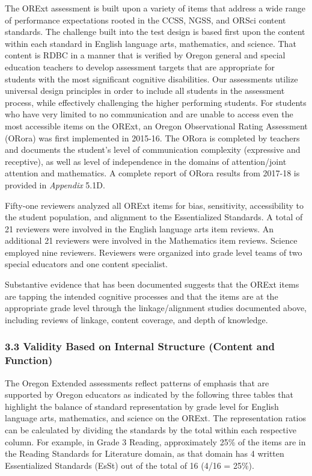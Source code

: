 \documentclass[]{article}
\begin{document}
The ORExt assessment is built upon a variety of items that address a
wide range of performance expectations rooted in the CCSS, NGSS, and
ORSci content standards. The challenge built into the test design is
based first upon the content within each standard in English language
arts, mathematics, and science. That content is RDBC in a manner that is
verified by Oregon general and special education teachers to develop
assessment targets that are appropriate for students with the most
significant cognitive disabilities. Our assessments utilize universal
design principles in order to include all students in the assessment
process, while effectively challenging the higher performing students.
For students who have very limited to no communication and are unable to
access even the most accessible items on the ORExt, an Oregon
Observational Rating Assessment (ORora) was first implemented in
2015-16. The ORora is completed by teachers and documents the student's
level of communication complexity (expressive and receptive), as well as
level of independence in the domains of attention/joint attention and
mathematics. A complete report of ORora results from 2017-18 is provided
in \emph{Appendix} 5.1D.

Fifty-one reviewers analyzed all ORExt items for bias, sensitivity,
accessibility to the student population, and alignment to the
Essentialized Standards. A total of 21 reviewers were involved in the
English language arts item reviews. An additional 21 reviewers were
involved in the Mathematics item reviews. Science employed nine
reviewers. Reviewers were organized into grade level teams of two
special educators and one content specialist.

Substantive evidence that has been documented suggests that the ORExt
items are tapping the intended cognitive processes and that the items
are at the appropriate grade level through the linkage/alignment studies
documented above, including reviews of linkage, content coverage, and
depth of knowledge.

\subsubsection{3.3 Validity Based on Internal Structure (Content and
Function)}\label{validity-based-on-internal-structure-content-and-function}

The Oregon Extended assessments reflect patterns of emphasis that are
supported by Oregon educators as indicated by the following three tables
that highlight the balance of standard representation by grade level for
English language arts, mathematics, and science on the ORExt. The
representation ratios can be calculated by dividing the standards by the
total within each respective column. For example, in Grade 3 Reading,
approximately 25\% of the items are in the Reading Standards for
Literature domain, as that domain has 4 written Essentialized Standards
(EsSt) out of the total of 16 (4/16 = 25\%).
\end{document}
